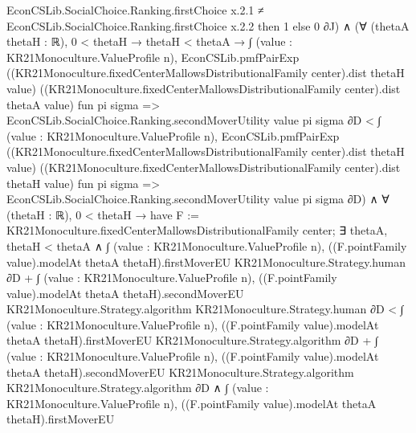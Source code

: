 \documentclass[10pt]{article}
\begin{document}
\begin{ReviewVerbatim}
                              EconCSLib.SocialChoice.Ranking.firstChoice x.2.1 ≠
                                EconCSLib.SocialChoice.Ranking.firstChoice x.2.2 then
                            1
                          else 0 ∂J) ∧
              (∀ (thetaA thetaH : ℝ),
                  0 < thetaH →
                    thetaH < thetaA →
                      ∫ (value : KR21Monoculture.ValueProfile n),
                          EconCSLib.pmfPairExp
                            ((KR21Monoculture.fixedCenterMallowsDistributionalFamily center).dist thetaH value)
                            ((KR21Monoculture.fixedCenterMallowsDistributionalFamily center).dist thetaA value)
                            fun pi sigma => EconCSLib.SocialChoice.Ranking.secondMoverUtility value pi sigma ∂D <
                        ∫ (value : KR21Monoculture.ValueProfile n),
                          EconCSLib.pmfPairExp
                            ((KR21Monoculture.fixedCenterMallowsDistributionalFamily center).dist thetaH value)
                            ((KR21Monoculture.fixedCenterMallowsDistributionalFamily center).dist thetaH value)
                            fun pi sigma => EconCSLib.SocialChoice.Ranking.secondMoverUtility value pi sigma ∂D) ∧
                ∀ (thetaH : ℝ),
                  0 < thetaH →
                    have F := KR21Monoculture.fixedCenterMallowsDistributionalFamily center;
                    ∃ thetaA,
                      thetaH < thetaA ∧
                        ∫ (value : KR21Monoculture.ValueProfile n),
                                ((F.pointFamily value).modelAt thetaA thetaH).firstMoverEU
                                  KR21Monoculture.Strategy.human ∂D +
                              ∫ (value : KR21Monoculture.ValueProfile n),
                                ((F.pointFamily value).modelAt thetaA thetaH).secondMoverEU
                                  KR21Monoculture.Strategy.algorithm KR21Monoculture.Strategy.human ∂D <
                            ∫ (value : KR21Monoculture.ValueProfile n),
                                ((F.pointFamily value).modelAt thetaA thetaH).firstMoverEU
                                  KR21Monoculture.Strategy.algorithm ∂D +
                              ∫ (value : KR21Monoculture.ValueProfile n),
                                ((F.pointFamily value).modelAt thetaA thetaH).secondMoverEU
                                  KR21Monoculture.Strategy.algorithm KR21Monoculture.Strategy.algorithm ∂D ∧
                          ∫ (value : KR21Monoculture.ValueProfile n),
                                  ((F.pointFamily value).modelAt thetaA thetaH).firstMoverEU

\end{ReviewVerbatim}
\end{document}
